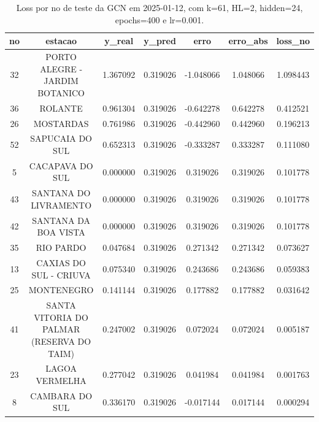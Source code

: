 \begin{table}[h]
\centering
\caption{Loss por no de teste da GCN em 2025-01-12, com k=61, HL=2, hidden=24, epochs=400 e lr=0.001.}
\label{tab:gcn_loss_k61_hl2_h24_e400_d20250112}
\begin{tabular}{ccccccc}
\toprule
no & estacao & y\_real & y\_pred & erro & erro\_abs & loss\_no \\
\midrule
32 & PORTO ALEGRE - JARDIM BOTANICO & 1.367092 & 0.319026 & -1.048066 & 1.048066 & 1.098443 \\
36 & ROLANTE & 0.961304 & 0.319026 & -0.642278 & 0.642278 & 0.412521 \\
26 & MOSTARDAS & 0.761986 & 0.319026 & -0.442960 & 0.442960 & 0.196213 \\
52 & SAPUCAIA DO SUL & 0.652313 & 0.319026 & -0.333287 & 0.333287 & 0.111080 \\
5 & CACAPAVA DO SUL & 0.000000 & 0.319026 & 0.319026 & 0.319026 & 0.101778 \\
43 & SANTANA DO LIVRAMENTO & 0.000000 & 0.319026 & 0.319026 & 0.319026 & 0.101778 \\
42 & SANTANA DA BOA VISTA & 0.000000 & 0.319026 & 0.319026 & 0.319026 & 0.101778 \\
35 & RIO PARDO & 0.047684 & 0.319026 & 0.271342 & 0.271342 & 0.073627 \\
13 & CAXIAS DO SUL - CRIUVA & 0.075340 & 0.319026 & 0.243686 & 0.243686 & 0.059383 \\
25 & MONTENEGRO & 0.141144 & 0.319026 & 0.177882 & 0.177882 & 0.031642 \\
41 & SANTA VITORIA DO PALMAR (RESERVA DO TAIM) & 0.247002 & 0.319026 & 0.072024 & 0.072024 & 0.005187 \\
23 & LAGOA VERMELHA & 0.277042 & 0.319026 & 0.041984 & 0.041984 & 0.001763 \\
8 & CAMBARA DO SUL & 0.336170 & 0.319026 & -0.017144 & 0.017144 & 0.000294 \\
\bottomrule
\end{tabular}
\end{table}
